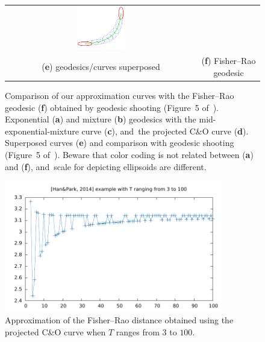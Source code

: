 \documentclass[entropy,article,accept,oneauthor,pdftex,entropy]{Definitions/mdpi}
\begin{document}
\begin{Example}
\begin{itemize}
\begin{figure}[H]
\begin{tabular}{cc}
\includegraphics[width=0.25\textwidth]{HanPark-Fig5.png} \\
(\textbf{e}) geodesics/curves superposed & (\textbf{f}) Fisher--Rao {geodesic}
\end{tabular}
\caption{Comparison of our approximation curves with the Fisher--Rao geodesic (\textbf{f}) obtained by geodesic shooting (Figure~5 of~\cite{MVNGeodesicShooting-2014}). 
Exponential (\textbf{a}) and mixture (\textbf{b}) geodesics with the mid-exponential-mixture curve (\textbf{c}), and~the projected C\&O curve (\textbf{d}).
Superposed curves (\textbf{e}) and comparison with geodesic shooting (Figure~5 of~\cite{MVNGeodesicShooting-2014}).
Beware that color coding is not related between (\textbf{a}) and (\textbf{f}), and~scale for depicting ellipsoids are different.}\label{Fig:HanPark}
\end{figure}
\unskip

\begin{figure}[H]

\includegraphics[width=0.85\textwidth]{HanParkPrecision3-100.pdf} 
\caption{Approximation of the Fisher–Rao distance obtained using the projected C\&O curve when $T$ ranges from $3$ to $100$.}
\label{Fig:HanParkRangeT}
\end{figure}
 




\end{itemize}
\end{Example}
\end{document}
